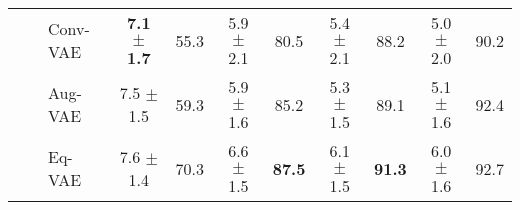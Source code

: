 \begin{table}[!ht]
\begin{center}
{\begin{tabular}{lll|cc|cc|cc|cc}
&& Conv-VAE & \bf{7.1 $\pm$ 1.7} & 55.3 & 5.9 $\pm$ 2.1 & 80.5 & 5.4 $\pm$ 2.1 & 88.2 & 5.0 $\pm$ 2.0  & 90.2 \\
&& Aug-VAE & 7.5 $\pm$ 1.5 & 59.3 & 5.9 $\pm$ 1.6 & 85.2 & 5.3 $\pm$ 1.5 & 89.1 & 5.1 $\pm$ 1.6  & 92.4  \\
&& Eq-VAE &  7.6 $\pm$ 1.4 & 70.3 & 6.6 $\pm$ 1.5 & \bf{87.5} & 6.1 $\pm$ 1.5 & \bf{91.3} & 6.0 $\pm$ 1.6 & 92.7  \\ \midrule
\bottomrule
\end{tabular}
}
\end{center}
\vspace*{\baselineskip}
\end{table}